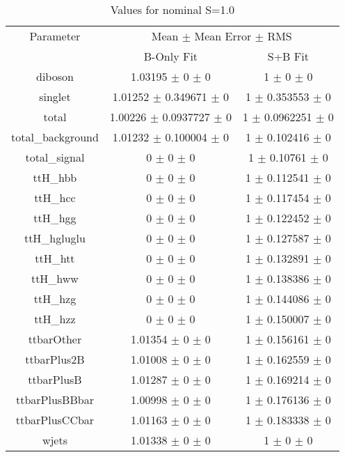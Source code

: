 \begin{table}
\centering
\caption{Values for nominal S=1.0}
\begin{tabular}{ccc}
\toprule
Parameter & \multicolumn{2}{c}{Mean $\pm$ Mean Error $\pm$ RMS}\\
 & B-Only Fit & S+B Fit\\
\midrule
diboson & \num{1.03195} $\pm$ \num{0} $\pm$ \num{0} & \num{1} $\pm$ \num{0} $\pm$ \num{0}\\
singlet & \num{1.01252} $\pm$ \num{0.349671} $\pm$ \num{0} & \num{1} $\pm$ \num{0.353553} $\pm$ \num{0}\\
total & \num{1.00226} $\pm$ \num{0.0937727} $\pm$ \num{0} & \num{1} $\pm$ \num{0.0962251} $\pm$ \num{0}\\
total\_background & \num{1.01232} $\pm$ \num{0.100004} $\pm$ \num{0} & \num{1} $\pm$ \num{0.102416} $\pm$ \num{0}\\
total\_signal & \num{0} $\pm$ \num{0} $\pm$ \num{0} & \num{1} $\pm$ \num{0.10761} $\pm$ \num{0}\\
ttH\_hbb & \num{0} $\pm$ \num{0} $\pm$ \num{0} & \num{1} $\pm$ \num{0.112541} $\pm$ \num{0}\\
ttH\_hcc & \num{0} $\pm$ \num{0} $\pm$ \num{0} & \num{1} $\pm$ \num{0.117454} $\pm$ \num{0}\\
ttH\_hgg & \num{0} $\pm$ \num{0} $\pm$ \num{0} & \num{1} $\pm$ \num{0.122452} $\pm$ \num{0}\\
ttH\_hgluglu & \num{0} $\pm$ \num{0} $\pm$ \num{0} & \num{1} $\pm$ \num{0.127587} $\pm$ \num{0}\\
ttH\_htt & \num{0} $\pm$ \num{0} $\pm$ \num{0} & \num{1} $\pm$ \num{0.132891} $\pm$ \num{0}\\
ttH\_hww & \num{0} $\pm$ \num{0} $\pm$ \num{0} & \num{1} $\pm$ \num{0.138386} $\pm$ \num{0}\\
ttH\_hzg & \num{0} $\pm$ \num{0} $\pm$ \num{0} & \num{1} $\pm$ \num{0.144086} $\pm$ \num{0}\\
ttH\_hzz & \num{0} $\pm$ \num{0} $\pm$ \num{0} & \num{1} $\pm$ \num{0.150007} $\pm$ \num{0}\\
ttbarOther & \num{1.01354} $\pm$ \num{0} $\pm$ \num{0} & \num{1} $\pm$ \num{0.156161} $\pm$ \num{0}\\
ttbarPlus2B & \num{1.01008} $\pm$ \num{0} $\pm$ \num{0} & \num{1} $\pm$ \num{0.162559} $\pm$ \num{0}\\
ttbarPlusB & \num{1.01287} $\pm$ \num{0} $\pm$ \num{0} & \num{1} $\pm$ \num{0.169214} $\pm$ \num{0}\\
ttbarPlusBBbar & \num{1.00998} $\pm$ \num{0} $\pm$ \num{0} & \num{1} $\pm$ \num{0.176136} $\pm$ \num{0}\\
ttbarPlusCCbar & \num{1.01163} $\pm$ \num{0} $\pm$ \num{0} & \num{1} $\pm$ \num{0.183338} $\pm$ \num{0}\\
wjets & \num{1.01338} $\pm$ \num{0} $\pm$ \num{0} & \num{1} $\pm$ \num{0} $\pm$ \num{0}\\
\bottomrule
\end{tabular}
\end{table}